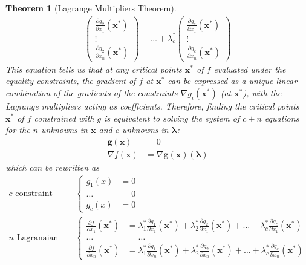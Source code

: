 \documentclass{article}
\newtheorem{theorem}{Theorem}[section]
\theoremstyle{remark}
\theoremstyle{definition}
\begin{document}
\begin{theorem}[Lagrange Multipliers Theorem]
\begin{align*}
\begin{pmatrix}
\frac{\partial g_2}{\partial x_1} (\mathbf{x}^*) \\ \vdots \\ \frac{\partial g_2}{\partial x_n}(\mathbf{x}^*)
\end{pmatrix} + \ldots + \lambda^*_c \begin{pmatrix}
\frac{\partial g_c}{\partial x_1} (\mathbf{x}^*) \\ \vdots \\ \frac{\partial g_c}{\partial x_n}(\mathbf{x}^*)
\end{pmatrix}
\end{align*}
This equation tells us that at any critical points $\mathbf{x}^*$ of $f$ evaluated under the equality constraints, the gradient of $f$ at $\mathbf{x}^*$ can be expressed as a unique linear combination of the gradients of the constraints $\nabla g_i (\mathbf{x}^*)$ (at $\mathbf{x}^*$), with the Lagrange multipliers acting as coefficients. Therefore, finding the critical points $\mathbf{x}^*$ of $f$ constrained with $g$ is equivalent to solving the system of $c + n$ equations for the $n$ unknowns in $\mathbf{x}$ and $c$ unknowns in $\boldsymbol{\lambda}$: 
\begin{align*}
    \mathbf{g}(\mathbf{x}) & = 0 \\ 
    \nabla f(\mathbf{x}) & = \nabla \mathbf{g}(\mathbf{x}) (\boldsymbol{\lambda})
\end{align*} 
which can be rewritten as
\begin{align*}
    c \text{ constraint equations} & \begin{cases}
    g_1 (x) & = 0 \\
    \ldots & = 0 \\
    g_c (x) & = 0
    \end{cases} \\
    n \text{ Lagranaian equations} & \begin{cases}
   \frac{\partial f}{\partial x_1} (\mathbf{x}^*) & = \lambda^*_1 \frac{\partial g_1}{\partial x_1} (\mathbf{x}^*) + \lambda^*_2 \frac{\partial g_2}{\partial x_1} (\mathbf{x}^*) + \ldots + \lambda^*_c \frac{\partial g_c}{\partial x_1} (\mathbf{x}^*) \\
    \ldots & = \ldots \\
    \frac{\partial f}{\partial x_n} (\mathbf{x}^*) & = \lambda^*_1 \frac{\partial g_1}{\partial x_n} (\mathbf{x}^*) + \lambda^*_2 \frac{\partial g_2}{\partial x_n} (\mathbf{x}^*) + \ldots + \lambda^*_c \frac{\partial g_c}{\partial x_n} (\mathbf{x}^*) 
    \end{cases}
\end{align*}
\end{theorem}
\end{document}
